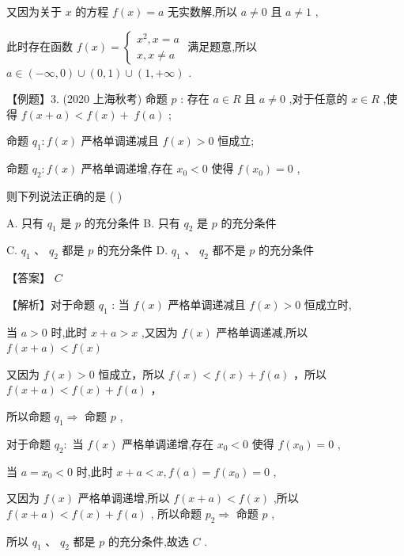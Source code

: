 \documentclass[10pt]{article}
\begin{document}
又因为关于 \(x\) 的方程 \(f\left( x\right)  = a\) 无实数解,所以 \(a \neq  0\) 且 \(a \neq  1\) ,

此时存在函数 \(f\left( x\right)  = \left\{  \begin{array}{l} {x}^{2},x = a \\  x,x \neq  a \end{array}\right.\) 满足题意,所以 \(a \in  \left( {-\infty ,0}\right)  \cup  \left( {0,1}\right)  \cup  \left( {1, + \infty }\right)\) .

【例题】3. (2020 上海秋考) 命题 \(p\) : 存在 \(a \in  R\) 且 \(a \neq  0\) ,对于任意的 \(x \in  R\) ,使得 \(f\left( {x + a}\right)  < f\left( x\right)  + \; f\left( a\right)\) ;

命题 \({q}_{1} : f\left( x\right)\) 严格单调递减且 \(f\left( x\right)  > 0\) 恒成立;

命题 \({q}_{2} : f\left( x\right)\) 严格单调递增,存在 \({x}_{0} < 0\) 使得 \(f\left( {x}_{0}\right)  = 0\) ,

则下列说法正确的是 ( )

A. 只有 \({q}_{1}\) 是 \(p\) 的充分条件 B. 只有 \({q}_{2}\) 是 \(p\) 的充分条件

C. \({q}_{1}\text{ 、 }{q}_{2}\) 都是 \(p\) 的充分条件 D. \({q}_{1}\text{ 、 }{q}_{2}\) 都不是 \(p\) 的充分条件

【答案】 \(C\)

【解析】对于命题 \({q}_{1}\) : 当 \(f\left( x\right)\) 严格单调递减且 \(f\left( x\right)  > 0\) 恒成立时,

当 \(a > 0\) 时,此时 \(x + a > x\) ,又因为 \(f\left( x\right)\) 严格单调递减,所以 \(f\left( {x + a}\right)  < f\left( x\right)\)

又因为 \(f\left( x\right)  > 0\) 恒成立，所以 \(f\left( x\right)  < f\left( x\right)  + f\left( a\right)\) ，所以 \(f\left( {x + a}\right)  < f\left( x\right)  + f\left( a\right)\) ，

所以命题 \({q}_{1} \Rightarrow\) 命题 \(p\) ,

对于命题 \({q}_{2} :\) 当 \(f\left( x\right)\) 严格单调递增,存在 \({x}_{0} < 0\) 使得 \(f\left( {x}_{0}\right)  = 0\) ,

当 \(a = {x}_{0} < 0\) 时,此时 \(x + a < x,f\left( a\right)  = f\left( {x}_{0}\right)  = 0\) ,

又因为 \(f\left( x\right)\) 严格单调递增,所以 \(f\left( {x + a}\right)  < f\left( x\right)\) ,所以 \(f\left( {x + a}\right)  < f\left( x\right)  + f\left( a\right)\) , 所以命题 \({p}_{2} \Rightarrow\) 命题 \(p\) ,

所以 \({q}_{1}\text{ 、 }{q}_{2}\) 都是 \(p\) 的充分条件,故选 \(C\) .
\end{document}
